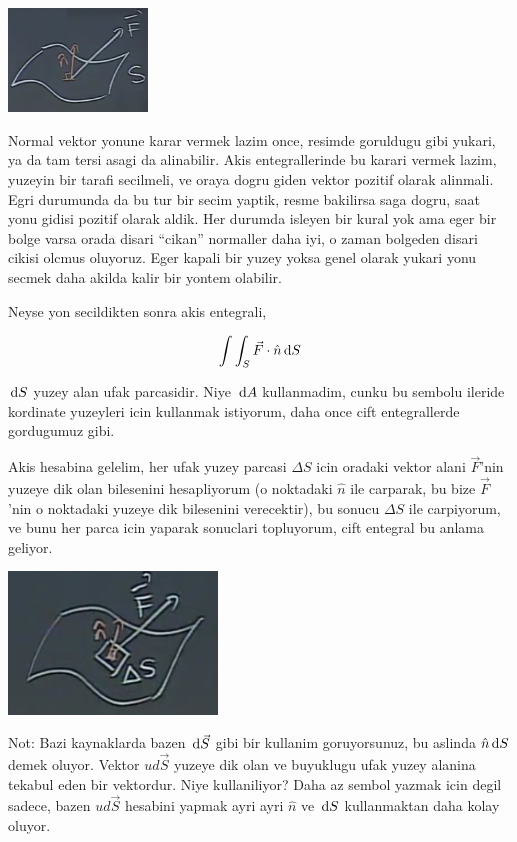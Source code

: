 \documentclass[12pt,fleqn]{article}\usepackage{../../common}
\begin{document}
\includegraphics[width=10em]{calc_multi_27_03.png}

Normal vektor yonune karar vermek lazim once, resimde goruldugu gibi yukari, ya
da tam tersi asagi da alinabilir. Akis entegrallerinde bu karari vermek lazim,
yuzeyin bir tarafi secilmeli, ve oraya dogru giden vektor pozitif olarak
alinmali. Egri durumunda da bu tur bir secim yaptik, resme bakilirsa saga dogru,
saat yonu gidisi pozitif olarak aldik. Her durumda isleyen bir kural yok ama
eger bir bolge varsa orada disari ``cikan'' normaller daha iyi, o zaman bolgeden
disari cikisi olcmus oluyoruz.  Eger kapali bir yuzey yoksa genel olarak yukari
yonu secmek daha akilda kalir bir yontem olabilir.

Neyse yon secildikten sonra akis entegrali,

$$
\int \int_S \vec{F} \cdot \hat{n} \,\mathrm{d} S
$$

$\,\mathrm{d} S$ yuzey alan ufak parcasidir. Niye $\,\mathrm{d} A$ kullanmadim, cunku bu
sembolu ileride kordinate yuzeyleri icin kullanmak istiyorum, daha once
cift entegrallerde gordugumuz gibi.

Akis hesabina gelelim, her ufak yuzey parcasi $\Delta S$ icin oradaki vektor
alani $\vec{F}$'nin yuzeye dik olan bilesenini hesapliyorum (o noktadaki
$\hat{n}$ ile carparak, bu bize $\vec{F}$'nin o noktadaki yuzeye dik bilesenini
verecektir), bu sonucu $\Delta S$ ile carpiyorum, ve bunu her parca icin
yaparak sonuclari topluyorum, cift entegral bu anlama geliyor.


\includegraphics[width=15em]{calc_multi_27_04.png}

Not: Bazi kaynaklarda bazen $\,\mathrm{d} \vec{S}$ gibi bir kullanim goruyorsunuz,
bu aslinda $\hat{n} \,\mathrm{d} S$ demek oluyor. Vektor $ud \vec{S}$ yuzeye dik
olan ve buyuklugu ufak yuzey alanina tekabul eden bir vektordur. Niye
kullaniliyor? Daha az sembol yazmak icin degil sadece, bazen $ud \vec{S}$
hesabini yapmak ayri ayri $\hat{n}$ ve $\,\mathrm{d} S$ kullanmaktan daha
kolay oluyor.
\end{document}

